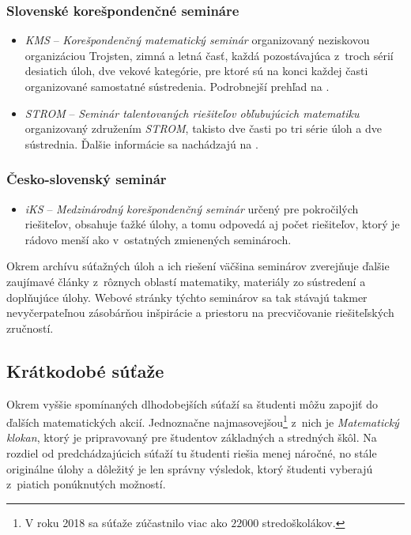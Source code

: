 \subsubsection{Slovenské korešpondenčné semináre}
\begin{itemize}
\item \textit{KMS} -- \textit{Korešpondenčný matematický seminár} organizovaný neziskovou organizáciou Trojsten, zimná a letná časť, každá pozostávajúca z~troch sérií desiatich úloh, dve vekové kategórie, pre ktoré sú na konci každej časti organizované samostatné sústredenia. Podrobnejší prehľad na \cite{kms}.
\item \textit{STROM} -- \textit{Seminár talentovaných riešiteľov obľubujúcich matematiku} organizovaný združením \textit{STROM}, takisto dve časti po tri série úloh a dve sústrednia. Ďalšie informácie sa nachádzajú na \cite{strom}.
\end{itemize}

\subsubsection*{Česko-slovenský seminár}
\begin{itemize}
\item \textit{iKS} -- \textit{Medzinárodný korešpondenčný seminár} určený pre pokročilých riešiteľov, obsahuje ťažké úlohy, a tomu odpovedá aj počet riešiteľov, ktorý je rádovo menší ako v~ostatných zmienených seminároch.
\end{itemize}

Okrem archívu súťažných úloh a ich riešení väčšina seminárov zverejňuje ďalšie zaujímavé články z~rôznych oblastí matematiky, materiály zo sústredení a doplňujúce úlohy. Webové stránky týchto seminárov sa tak stávajú takmer nevyčerpateľnou zásobárňou inšpirácie a priestoru na precvičovanie riešiteľských zručností.


\subsection*{Krátkodobé súťaže}

Okrem vyššie spomínaných dlhodobejších súťaží sa študenti môžu zapojiť do ďalších matematických akcií. Jednoznačne najmasovejšou\footnote{V roku 2018 sa súťaže zúčastnilo viac ako $22000$ stredoškolákov.} z~nich je \textit{Matematický klokan}, ktorý je pripravovaný pre študentov základných a stredných škôl. Na rozdiel od predchádzajúcich súťaží tu študenti riešia menej náročné, no stále originálne úlohy a dôležitý je len správny výsledok, ktorý študenti vyberajú z~piatich ponúknutých možností.

